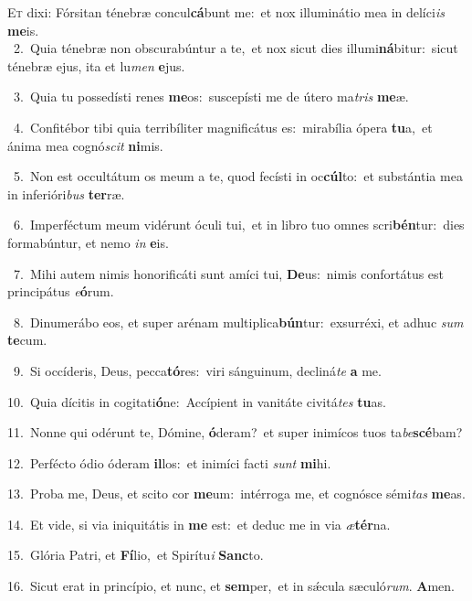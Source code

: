 \lettrine{\initial\textcolor{\initialcolor}{E}}{t} dixi: Fórsitan ténebræ concul\-\textbf{cá}\-bunt me:~\star et nox illuminátio mea in delíci\textit{is} \textbf{me}\-is.\\
{\numbfont\textcolor{\numbcolor}{~2.}}~Quia ténebræ non obscurabúntur a te,~\dagger et nox sicut dies illumi\-\textbf{ná}\-bitur:~\star sicut ténebræ ejus, ita et lu\textit{men} \textbf{e}\-jus.\par
{\numbfont\textcolor{\numbcolor}{~3.}}~Quia tu possedísti renes \textbf{me}\-os:~\star suscepísti me de útero ma\textit{tris} \textbf{me}\-æ.\par
{\numbfont\textcolor{\numbcolor}{~4.}}~Confitébor tibi quia terribíliter magnificátus es:~\dagger mirabília ópera \textbf{tu}\-a,~\star et ánima mea cognó\textit{scit} \textbf{ni}\-mis.\par
{\numbfont\textcolor{\numbcolor}{~5.}}~Non est occultátum os meum a te, quod fecísti in oc\-\textbf{cúl}\-to:~\star et substántia mea in inferióri\textit{bus} \textbf{ter}\-ræ.\par
{\numbfont\textcolor{\numbcolor}{~6.}}~Imperféctum meum vidérunt óculi tui,~\dagger et in libro tuo omnes scri\-\textbf{bén}\-tur:~\star dies formabúntur, et nemo \textit{in} \textbf{e}\-is.\par
{\numbfont\textcolor{\numbcolor}{~7.}}~Mihi autem nimis honorificáti sunt amíci tui, \textbf{De}\-us:~\star nimis confortátus est principátus \textit{e}\-\textbf{ó}rum.\par
{\numbfont\textcolor{\numbcolor}{~8.}}~Dinumerábo eos, et super arénam multiplica\-\textbf{bún}\-tur:~\star exsurréxi, et adhuc \textit{sum} \textbf{te}\-cum.\par
{\numbfont\textcolor{\numbcolor}{~9.}}~Si occíderis, Deus, pecca\-\textbf{tó}\-res:~\star viri sánguinum, decliná\textit{te} \textbf{a} me.\par
{\numbfont\textcolor{\numbcolor}{10.}}~Quia dícitis in cogitati\-\textbf{ó}\-ne:~\star Accípient in vanitáte civitá\textit{tes} \textbf{tu}\-as.\par
{\numbfont\textcolor{\numbcolor}{11.}}~Nonne qui odérunt te, Dómine, \textbf{ó}\-deram?~\star et super inimícos tuos ta\-\textit{be}\-\textbf{scé}bam?\par
{\numbfont\textcolor{\numbcolor}{12.}}~Perfécto ódio óderam \textbf{il}\-los:~\star et inimíci facti \textit{sunt} \textbf{mi}\-hi.\par
{\numbfont\textcolor{\numbcolor}{13.}}~Proba me, Deus, et scito cor \textbf{me}\-um:~\star intérroga me, et cognósce sémi\textit{tas} \textbf{me}\-as.\par
{\numbfont\textcolor{\numbcolor}{14.}}~Et vide, si via iniquitátis in \textbf{me} est:~\star et deduc me in via \textit{æ}\-\textbf{tér}na.\par
{\numbfont\textcolor{\numbcolor}{15.}}~Glória Patri, et \textbf{Fí}\-lio,~\star et Spirítu\textit{i} \textbf{Sanc}\-to.\par
{\numbfont\textcolor{\numbcolor}{16.}}~Sicut erat in princípio, et nunc, et \textbf{sem}\-per,~\star et in sǽcula sæculó\-\textit{rum}\-. \textbf{A}\-men.\par
